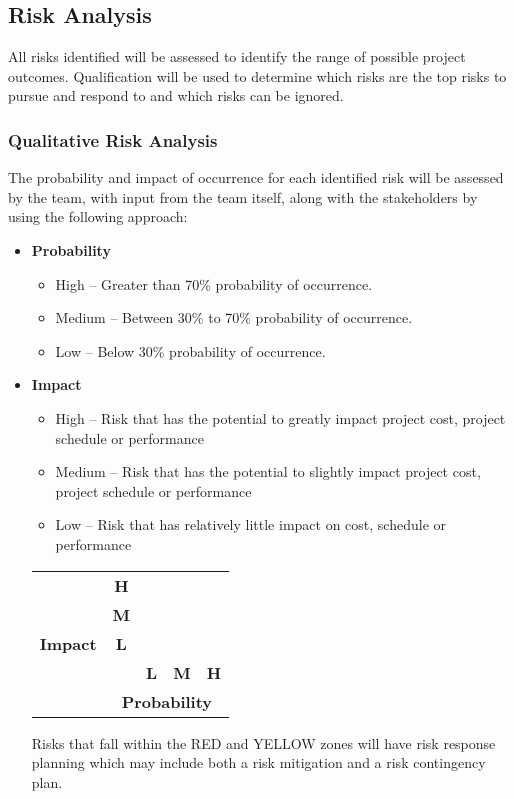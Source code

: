 \documentclass{article}
\begin{document}
\subsection{Risk Analysis}
All risks identified will be assessed to identify the range of possible project outcomes.  Qualification will be used to determine which risks are the top risks to pursue and respond to and which risks can be ignored.

\subsubsection{Qualitative Risk Analysis}
The probability and impact of occurrence for each identified risk will be assessed by the team, with input from the team itself, along with the stakeholders by using the following approach:

\begin{itemize}
    \item \textbf{Probability}
    \begin{itemize}
         \item High – Greater than 70\% probability of occurrence.
    \item Medium – Between 30\% to 70\% probability of occurrence.
    \item Low – Below 30\% probability of occurrence.
    \end{itemize}
    \item \textbf{Impact}
    \begin{itemize}
        \item High – Risk that has the potential to greatly impact project cost, project schedule or performance
        \item Medium – Risk that has the potential to slightly impact project cost, project schedule or performance
        \item Low – Risk that has relatively little impact on cost, schedule or performance
    \end{itemize}
    \begin{table}[h]
\centering
\begin{tabular}{|c|c|lll|}
\cline{1-5}
\multirow{5}{*}{\textbf{Impact}} & \textbf{H} & \cellcolor{yellow} &\cellcolor{red}  & \cellcolor{red} \\ \cline{2-2}
 & \textbf{M} & \cellcolor{green} & \cellcolor{yellow} &\cellcolor{red}  \\ \cline{2-2}
 & \textbf{L} &  \cellcolor{green}& \cellcolor{green} &\cellcolor{yellow}  \\ \cline{2-5} 
 & \textbf{} & \multicolumn{1}{l|}{\textbf{L}} & \multicolumn{1}{l|}{\textbf{M}} & \multicolumn{1}{l|}{\textbf{H}} \\ \cline{2-5} 
 & \multicolumn{4}{c|}{\textbf{Probability}} \\ \hline
\end{tabular}
\end{table}
Risks that fall within the RED and YELLOW zones will have risk response planning which may include both a risk mitigation and a risk contingency plan.
\end{itemize}
\end{document}
